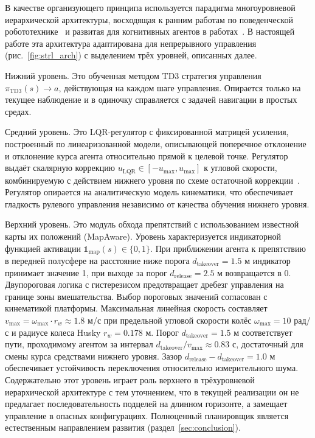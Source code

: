 \documentclass[11pt]{article}
\begin{document}
В качестве организующего принципа используется парадигма многоуровневой
иерархической архитектуры, восходящая к ранним работам по поведенческой
робототехнике~\cite{gat1998three} и развитая для когнитивных агентов
в работах~\cite{kiselev2020dissertation,kiselev2020}. В настоящей работе
эта архитектура адаптирована для непрерывного управления (рис.~\ref{fig:strl_arch}) с выделением трёх уровней, описанных далее.

Нижний уровень. Это обученная методом TD3 стратегия управления $\pi_{\mathrm{TD3}}(s) \to a$, действующая на каждом шаге управления. Опирается только на текущее наблюдение и в одиночку справляется с задачей навигации в простых средах.

Средний уровень. Это LQR-регулятор с фиксированной матрицей усиления, построенный по линеаризованной модели, описывающей поперечное отклонение и отклонение курса агента относительно прямой к целевой точке. Регулятор выдаёт скалярную коррекцию $u_{\mathrm{LQR}} \in [-u_{\max}, u_{\max}]$ к угловой скорости, комбинируемую с действием нижнего уровня по схеме остаточной коррекции~\cite{silver2018residual,johannink2019residual}. Регулятор опирается на аналитическую модель кинематики, что обеспечивает гладкость рулевого управления независимо от качества обучения нижнего уровня.

Верхний уровень. Это модуль обхода препятствий с использованием известной карты их положений (MapAware). Уровень характеризуется индикаторной функцией активации $\mathbb{1}_{\mathrm{map}}(s) \in \{0, 1\}$. При приближении агента к препятствию в передней полусфере на расстояние ниже порога $d_{\mathrm{takeover}} = 1.5$ м индикатор принимает значение 1, при выходе за порог $d_{\mathrm{release}} = 2.5$ м возвращается в 0. Двупороговая логика с гистерезисом предотвращает дребезг управления на границе зоны вмешательства. Выбор пороговых значений согласован с кинематикой платформы. Максимальная линейная скорость составляет $v_{\max} = \omega_{\max} \cdot r_w \approx 1.8$ м/с при предельной угловой скорости колёс $\omega_{\max} = 10$ рад/с и радиусе колеса Husky $r_w = 0.178$ м. Порог $d_{\mathrm{takeover}} = 1.5$ м соответствует пути, проходимому агентом за интервал $d_{\mathrm{takeover}} / v_{\max} \approx 0.83$ с, достаточный для смены курса средствами нижнего уровня. Зазор $d_{\mathrm{release}} - d_{\mathrm{takeover}} = 1.0$ м обеспечивает устойчивость переключения относительно измерительного шума. Содержательно этот уровень играет роль верхнего в трёхуровневой иерархической архитектуре с тем уточнением, что в текущей реализации он не предлагает последовательность подцелей на длинном горизонте, а замещает управление в опасных конфигурациях. Полноценный планировщик является естественным направлением развития (раздел~\ref{sec:conclusion}).
\end{document}
